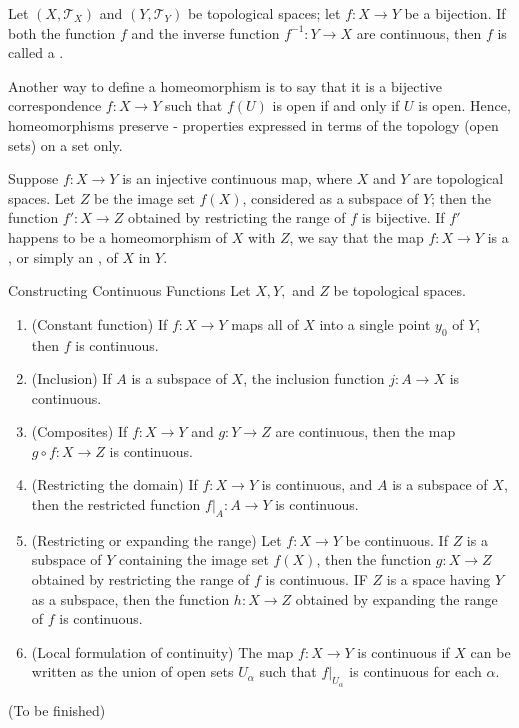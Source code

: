 \documentclass[12pt, a4paper, twoside, openright, titlepage]{book}
\begin{document}
\begin{defn}{}{}
    Let $(X,\mathcal{T}_X)$ and $(Y,\mathcal{T}_Y)$ be topological spaces; let $f:X\rightarrow Y$ be a bijection. If both the function $f$ and the inverse function $f^{-1}:Y\rightarrow X$ are continuous, then $f$ is called a .
\end{defn}

\begin{rmk}{}{}
    Another way to define a homeomorphism is to say that it is a bijective correspondence $f:X\rightarrow Y$ such that $f(U)$ is open if and only if $U$ is open. Hence, homeomorphisms preserve  - properties expressed in terms of the topology (open sets) on a set only.
\end{rmk}

\begin{defn}{}{}
    Suppose $f:X\rightarrow Y$ is an injective continuous map, where $X$ and $Y$ are topological spaces. Let $Z$ be the image set $f(X)$, considered as a subspace of $Y$; then the function $f':X\rightarrow Z$ obtained by restricting the range of $f$ is bijective. If $f'$ happens to be a homeomorphism of $X$ with $Z$, we say that the map $f:X\rightarrow Y$ is a , or simply an , of $X$ in $Y$.
\end{defn}



\begin{thm}{Constructing Continuous Functions}{}
    Let $X,Y,$ and $Z$ be topological spaces. \begin{enumerate}
        \item (Constant function) If $f:X\rightarrow Y$ maps all of $X$ into a single point $y_0$ of $Y$, then $f$ is continuous.
        \item (Inclusion) If $A$ is a subspace of $X$, the inclusion function $j:A\rightarrow X$ is continuous.
        \item (Composites) If $f:X\rightarrow Y$ and $g:Y\rightarrow Z$ are continuous, then the map $g\circ f:X\rightarrow Z$ is continuous.
        \item (Restricting the domain) If $f:X\rightarrow Y$ is continuous, and $A$ is a subspace of $X$, then the restricted function $f\rvert_A:A\rightarrow Y$ is continuous. 
        \item (Restricting or expanding the range) Let $f:X\rightarrow Y$ be continuous. If $Z$ is a subspace of $Y$ containing the image set $f(X)$, then the function $g:X\rightarrow Z$ obtained by restricting the range of $f$ is continuous. IF $Z$ is a space having $Y$ as a subspace, then the function $h:X\rightarrow Z$ obtained by expanding the range of $f$ is continuous. 
        \item (Local formulation of continuity) The map $f:X\rightarrow Y$ is continuous if $X$ can be written as the union of open sets $U_{\alpha}$ such that $f\rvert_{U_{\alpha}}$ is continuous for each $\alpha$.
    \end{enumerate}
\end{thm}
\begin{proof*}{}{}
    (To be finished)
\end{proof*}
\end{document}
